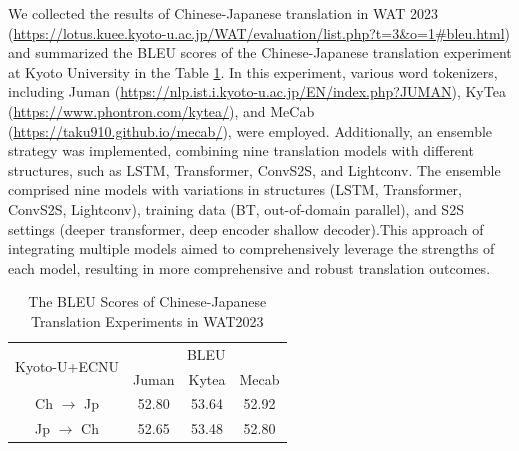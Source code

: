 \documentclass[acmsmall]{acmart}
\begin{document}
\color{red}
We collected the results of Chinese-Japanese translation in WAT 2023 (\url{https://lotus.kuee.kyoto-u.ac.jp/WAT/evaluation/list.php?t=3&o=1#bleu.html}) and summarized the BLEU scores of the Chinese-Japanese translation experiment at Kyoto University in the Table \ref{Jap}. 
In this experiment, various word tokenizers, including Juman (\url{https://nlp.ist.i.kyoto-u.ac.jp/EN/index.php?JUMAN}), KyTea (\url{https://www.phontron.com/kytea/}), and MeCab (\url{https://taku910.github.io/mecab/}), were employed. Additionally, an ensemble strategy was implemented, combining nine translation models with different structures, such as LSTM, Transformer, ConvS2S, and Lightconv. The ensemble comprised nine models with variations in structures (LSTM, Transformer, ConvS2S, Lightconv), training data (BT, out-of-domain parallel), and S2S settings (deeper transformer, deep encoder shallow decoder).This approach of integrating multiple models aimed to comprehensively leverage the strengths of each model, resulting in more comprehensive and robust translation outcomes.
\color{black}

\begin{table}[ht]
    \centering
    \caption{The BLEU Scores of Chinese-Japanese Translation Experiments in WAT2023}
	\label{Jap}
    \begin{tabular}{cccc}
        \toprule
        \multirow{2}{*}{Kyoto-U+ECNU} & \multicolumn{3}{c}{BLEU} \\
        \cmidrule{2-4}
        & Juman & Kytea & Mecab \\
        \midrule
        Ch $\rightarrow$ Jp & 52.80 & 53.64 & 52.92 \\
        Jp $\rightarrow$ Ch & 52.65 & 53.48 & 52.80 \\
        \bottomrule
    \end{tabular}
\end{table}
\end{document}
